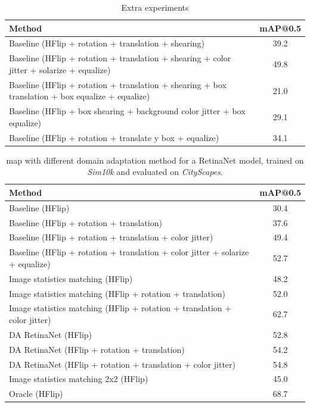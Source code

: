\documentclass[%
    corpo=12pt,
    twoside,
    stile=classica,   
    tipotesi=magistrale,
    evenboxes,
    english,
	numerazioneromana,
]{toptesi}
\begin{document}

\begin{table}[ht!]
	\centering
	\begin{tabularx}{\linewidth}{|X|c|}
		\hline
		Method  &   mAP@0.5 \\
		\hline\hline
		Baseline (HFlip + rotation + translation + shearing)      &   39.2   \\
		\hline
		Baseline (HFlip + rotation + translation + shearing + color jitter + solarize + equalize)      &   49.8   \\
		\hline
		Baseline (HFlip + rotation + translation + shearing + box translation + box equalize + equalize)      &   21.0   \\
		\hline
		Baseline (HFlip + box shearing + background color jitter + box equalize)      &   29.1   \\
		\hline
		Baseline (HFlip + rotation + translate y box + equalize)      &   34.1   \\
		\hline
	\end{tabularx}
	\caption{Extra experiments}
	\label{table:extra}
\end{table}

\begin{table}[ht!]
	\centering
	\begin{tabularx}{\linewidth}{|X|c|}
		\hline
		Method  &   mAP@0.5 \\
		\hline\hline
		Baseline (HFlip)       &   30.4   \\
		\hline
		Baseline (HFlip + rotation + translation)      &   37.6   \\
		\hline
		Baseline (HFlip + rotation + translation + color jitter)      &   49.4   \\
		\hline
		Baseline (HFlip + rotation + translation + color jitter + solarize + equalize)      &   52.7   \\
		\hline
		Image statistics matching (HFlip)  &   48.2    \\
		\hline
		Image statistics matching (HFlip + rotation + translation)  &   52.0    \\
		\hline
		Image statistics matching (HFlip + rotation + translation + color jitter)  &   62.7    \\
		\hline
		DA RetinaNet (HFlip)   &   52.8    \\
		\hline
		DA RetinaNet (HFlip + rotation + translation)   &   54.2    \\
		\hline
		DA RetinaNet (HFlip + rotation + translation + color jitter)   &   54.8    \\
		\hline\hline
		Image statistics matching 2x2 (HFlip) &   45.0    \\
		\hline\hline
		Oracle (HFlip) &   68.7    \\
		\hline
	\end{tabularx}
	\caption{\gls{map} with different domain adaptation method for a RetinaNet model, trained on \textit{Sim10k} and evaluated on \textit{CityScapes}.}
	\label{table:retinanet}
\end{table}
\end{document}
